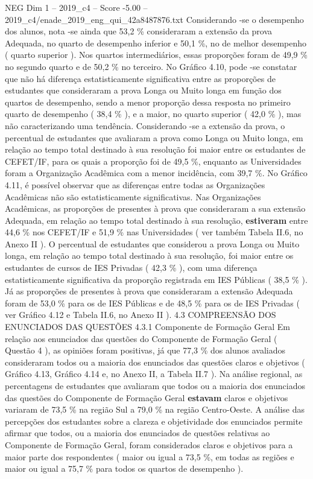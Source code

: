 \begin{textsample}{NEG Dim 1 – 2019\_c4 – Score -5.00 – 2019\_c4/enade\_2019\_eng\_qui\_42a8487876.txt}
Considerando -se o desempenho dos alunos, nota -se ainda que 53,2 \% consideraram a extensão da prova Adequada, no quarto de desempenho inferior e 50,1 \%, no de melhor desempenho ( quarto superior ).
Nos quartos intermediários, essas proporções foram de 49,9 \% no segundo quarto e de 50,2 \% no terceiro.
No Gráfico 4.10, pode -se constatar que não há diferença estatisticamente significativa entre as proporções de estudantes que consideraram a prova Longa ou Muito longa em função dos quartos de desempenho, sendo a menor proporção dessa resposta no primeiro quarto de desempenho ( 38,4 \% ), e a maior, no quarto superior ( 42,0 \% ), mas não caracterizando uma tendência.
Considerando -se a extensão da prova, o percentual de estudantes que avaliaram a prova como Longa ou Muito longa, em relação ao tempo total destinado à sua resolução foi maior entre os estudantes de CEFET/IF, para os quais a proporção foi de 49,5 \%, enquanto as Universidades foram a Organização Acadêmica com a menor incidência, com 39,7 \%.
No Gráfico 4.11, é possível observar que as diferenças entre todas as Organizações Acadêmicas não são estatisticamente significativas.
Nas Organizações Acadêmicas, as proporções de presentes à prova que consideraram a sua extensão Adequada, em relação ao tempo total destinado à sua resolução, \textbf{estiveram} entre 44,6 \% nos CEFET/IF e 51,9 \% nas Universidades ( ver também Tabela II.6, no Anexo II ).
O percentual de estudantes que considerou a prova Longa ou Muito longa, em relação ao tempo total destinado à sua resolução, foi maior entre os estudantes de cursos de IES Privadas ( 42,3 \% ), com uma diferença estatisticamente significativa da proporção registrada em IES Públicas ( 38,5 \% ).
Já as proporções de presentes à prova que consideraram a extensão Adequada foram de 53,0 \% para os de IES Públicas e de 48,5 \% para os de IES Privadas ( ver Gráfico 4.12 e Tabela II.6, no Anexo II ). 4.3 COMPREENSÃO DOS ENUNCIADOS DAS QUESTÕES 4.3.1 Componente de Formação Geral Em relação aos enunciados das questões do Componente de Formação Geral ( Questão 4 ), as opiniões foram positivas, já que 77,3 \% dos alunos avaliados consideraram todos ou a maioria dos enunciados das questões claros e objetivos ( Gráfico 4.13, Gráfico 4.14 e, no Anexo II, a Tabela II.7 ).
Na análise regional, as percentagens de estudantes que avaliaram que todos ou a maioria dos enunciados das questões do Componente de Formação Geral \textbf{estavam} claros e objetivos variaram de 73,5 \% na região Sul a 79,0 \% na região Centro-Oeste.
A análise das percepções dos estudantes sobre a clareza e objetividade dos enunciados permite afirmar que todos, ou a maioria dos enunciados de questões relativas ao Componente de Formação Geral, foram considerados claros e objetivos para a maior parte dos respondentes ( maior ou igual a 73,5 \%, em todas as regiões e maior ou igual a 75,7 \% para todos os quartos de desempenho ).

\end{textsample}
